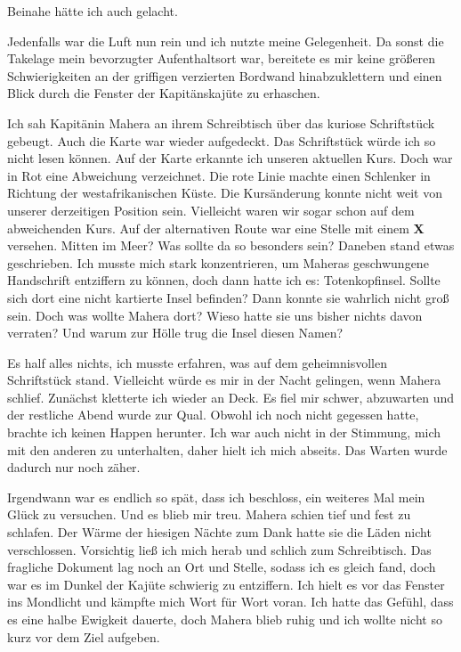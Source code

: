 Beinahe hätte ich auch gelacht.

Jedenfalls war die Luft nun rein und ich nutzte meine Gelegenheit. Da sonst die Takelage mein bevorzugter Aufenthaltsort war, bereitete es mir keine größeren Schwierigkeiten an der griffigen verzierten Bordwand hinabzuklettern und einen Blick durch die Fenster der Kapitänskajüte zu erhaschen.

Ich sah Kapitänin Mahera an ihrem Schreibtisch über das kuriose Schriftstück gebeugt. Auch die Karte war wieder aufgedeckt. Das Schriftstück würde ich so nicht lesen können. Auf der Karte erkannte ich unseren aktuellen Kurs. Doch war in Rot eine Abweichung verzeichnet. Die rote Linie machte einen Schlenker in Richtung der westafrikanischen Küste. Die Kursänderung konnte nicht weit von unserer derzeitigen Position sein. Vielleicht waren wir sogar schon auf dem abweichenden Kurs. Auf der alternativen Route war eine Stelle mit einem {\boldfont\textbf{X}} versehen. Mitten im Meer? Was sollte da so besonders sein? Daneben stand etwas geschrieben. Ich musste mich stark konzentrieren, um Maheras geschwungene Handschrift entziffern zu können, doch dann hatte ich es: Totenkopfinsel. Sollte sich dort eine nicht kartierte Insel befinden? Dann konnte sie wahrlich nicht groß sein. Doch was wollte Mahera dort? Wieso hatte sie uns bisher nichts davon verraten? Und warum zur Hölle trug die Insel diesen Namen?

Es half alles nichts, ich musste erfahren, was auf dem geheimnisvollen Schriftstück stand. Vielleicht würde es mir in der Nacht gelingen, wenn Mahera schlief. Zunächst kletterte ich wieder an Deck. Es fiel mir schwer, abzuwarten und der restliche Abend wurde zur Qual. Obwohl ich noch nicht gegessen hatte, brachte ich keinen Happen herunter. Ich war auch nicht in der Stimmung, mich mit den anderen zu unterhalten, daher hielt ich mich abseits. Das Warten wurde dadurch nur noch zäher.

Irgendwann war es endlich so spät, dass ich beschloss, ein weiteres Mal mein Glück zu versuchen. Und es blieb mir treu. Mahera schien tief und fest zu schlafen. Der Wärme der hiesigen Nächte zum Dank hatte sie die Läden nicht verschlossen. Vorsichtig ließ ich mich herab und schlich zum Schreibtisch. Das fragliche Dokument lag noch an Ort und Stelle, sodass ich es gleich fand, doch war es im Dunkel der Kajüte schwierig zu entziffern. Ich hielt es vor das Fenster ins Mondlicht und kämpfte mich Wort für Wort voran. Ich hatte das Gefühl, dass es eine halbe Ewigkeit dauerte, doch Mahera blieb ruhig und ich wollte nicht so kurz vor dem Ziel aufgeben.


